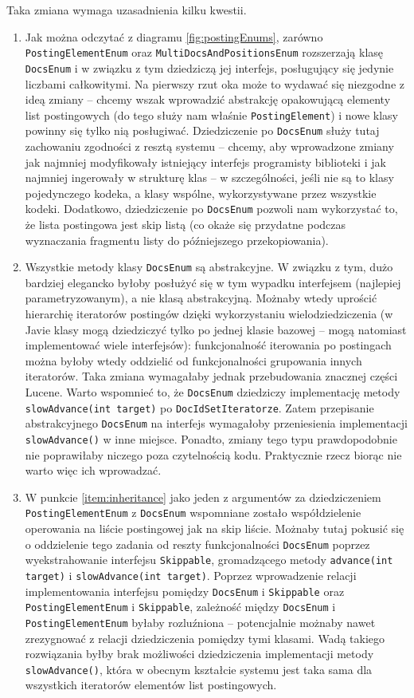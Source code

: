 Taka zmiana wymaga uzasadnienia kilku kwestii.
\begin{enumerate}
 \item \label{item:inheritance} Jak można odczytać z diagramu \ref{fig:postingEnums}, zarówno \texttt{PostingElementEnum} oraz \texttt{MultiDocsAndPositionsEnum} rozszerzają klasę \texttt{DocsEnum} i w związku z tym dziedziczą jej interfejs, posługujący się jedynie liczbami całkowitymi. Na pierwszy rzut oka może to wydawać się niezgodne z ideą zmiany -- chcemy wszak wprowadzić abstrakcję opakowującą elementy list postingowych (do tego służy nam właśnie \texttt{PostingElement}) i nowe klasy powinny się tylko nią posługiwać. Dziedziczenie po \texttt{DocsEnum} służy tutaj zachowaniu zgodności z resztą systemu -- chcemy, aby wprowadzone zmiany jak najmniej modyfikowały istniejący interfejs programisty biblioteki i jak najmniej ingerowały w strukturę klas -- w szczególności, jeśli nie są to klasy pojedynczego kodeka, a klasy wspólne, wykorzystywane przez wszystkie kodeki. Dodatkowo, dziedziczenie po \texttt{DocsEnum} pozwoli nam wykorzystać to, że lista postingowa jest skip listą (co okaże się przydatne podczas wyznaczania fragmentu listy do późniejszego przekopiowania).
 \item Wszystkie metody klasy \texttt{DocsEnum} są abstrakcyjne. W związku z tym, dużo bardziej elegancko byłoby posłużyć się w tym wypadku interfejsem (najlepiej parametryzowanym), a nie klasą abstrakcyjną. Możnaby wtedy uprościć hierarchię iteratorów postingów dzięki wykorzystaniu wielodziedziczenia (w Javie klasy mogą dziedziczyć tylko po jednej klasie bazowej -- mogą natomiast implementować wiele interfejsów): funkcjonalność iterowania po postingach można byłoby wtedy oddzielić od funkcjonalności grupowania innych iteratorów. Taka zmiana wymagałaby jednak przebudowania znacznej części Lucene. Warto wspomnieć to, że \texttt{DocsEnum} dziedziczy implementację metody \texttt{slowAdvance(int target)} po \texttt{DocIdSetIteratorze}. Zatem przepisanie abstrakcyjnego \texttt{DocsEnum} na interfejs wymagałoby przeniesienia implementacji \texttt{slowAdvance()} w inne miejsce. Ponadto, zmiany tego typu prawdopodobnie nie poprawiłaby niczego poza czytelnością kodu. Praktycznie rzecz biorąc nie warto więc ich wprowadzać.
 \item W punkcie \ref{item:inheritance} jako jeden z argumentów za dziedziczeniem \texttt{PostingElementEnum} z \texttt{DocsEnum} wspomniane zostało współdzielenie operowania na liście postingowej jak na skip liście. Możnaby tutaj pokusić się o oddzielenie tego zadania od reszty funkcjonalności \texttt{DocsEnum} poprzez wyekstrahowanie interfejsu \texttt{Skippable}, gromadzącego metody \texttt{advance(int target)} i \texttt{slowAdvance(int target)}. Poprzez wprowadzenie relacji implementowania interfejsu pomiędzy \texttt{DocsEnum} i \texttt{Skippable} oraz \texttt{PostingElementEnum} i \texttt{Skippable}, zależność między \texttt{DocsEnum} i \texttt{PostingElementEnum} byłaby rozluźniona -- potencjalnie możnaby nawet zrezygnować z relacji dziedziczenia pomiędzy tymi klasami. Wadą takiego rozwiązania byłby brak możliwości dziedziczenia implementacji metody \texttt{slowAdvance()}, która w obecnym kształcie systemu jest taka sama dla wszystkich iteratorów elementów list postingowych.

\end{enumerate}
